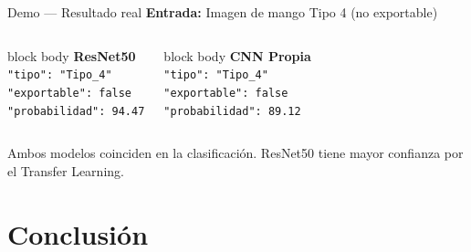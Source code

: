 \documentclass[aspectratio=169]{beamer}
\begin{document}
\begin{frame}{Demo — Resultado real}
  \centering
  \textbf{Entrada:} Imagen de mango Tipo 4 (no exportable)

  \vspace{0.5em}
  \begin{columns}
    \begin{beamercolorbox}[wd=\textwidth,center,rounded=true]{block body}
      \textbf{ResNet50}\\
      \texttt{"tipo": "Tipo\_4"}\\
      \texttt{"exportable": false}\\
      \texttt{"probabilidad": 94.47}
    \end{beamercolorbox}

    \begin{beamercolorbox}[wd=\textwidth,center,rounded=true]{block body}
      \textbf{CNN Propia}\\
      \texttt{"tipo": "Tipo\_4"}\\
      \texttt{"exportable": false}\\
      \texttt{"probabilidad": 89.12}
    \end{beamercolorbox}
  \end{columns}

  \vspace{1em}
  \footnotesize Ambos modelos coinciden en la clasificación. ResNet50 tiene mayor confianza por el Transfer Learning.
\end{frame}

\section{Conclusión}
\end{document}
